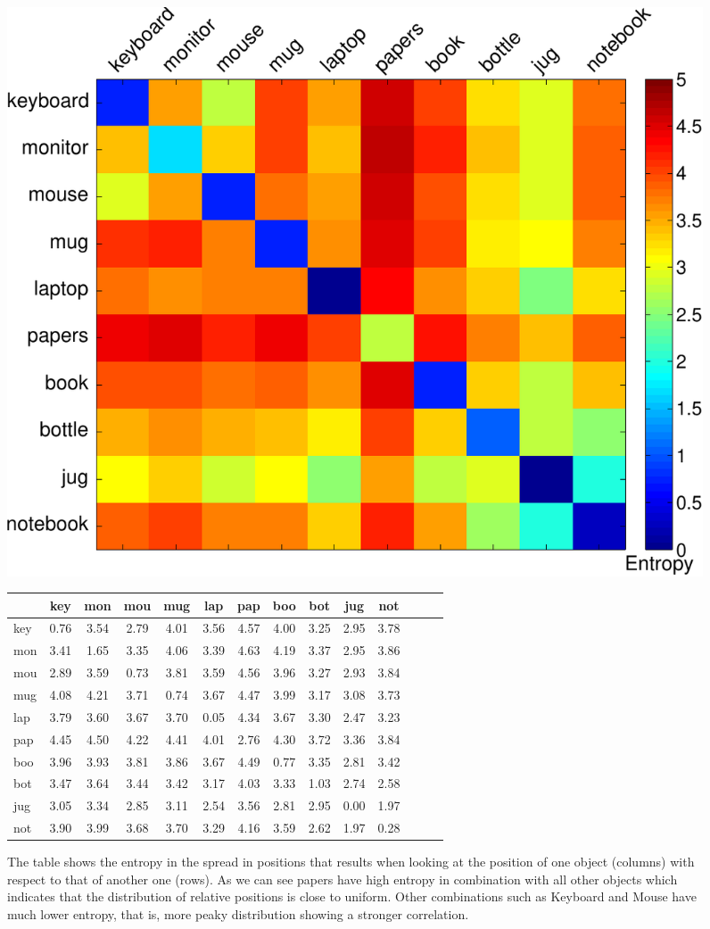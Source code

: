 \documentclass[letterpaper, 10 pt, conference]{ieeeconf}  %
\begin{document}
\begin{figure}
\begin{center}
\includegraphics[width=0.5\linewidth]{entropy_matrix-crop} \quad
\begin{tabular}{|l||c|c|c|c|c|c|c|c|c|c|c|c|c|}
\hline
& key & mon & mou & mug & lap & pap & boo & bot & jug & not \\ \hline \hline
key & 0.76 & 3.54 & 2.79 & 4.01 & 3.56 & 4.57 & 4.00 & 3.25 & 2.95 & 3.78\\ \hline
mon & 3.41 & 1.65 & 3.35 & 4.06 & 3.39 & 4.63 & 4.19 & 3.37 & 2.95 & 3.86\\ \hline
mou & 2.89 & 3.59 & 0.73 & 3.81 & 3.59 & 4.56 & 3.96 & 3.27 & 2.93 & 3.84 \\ \hline
mug & 4.08 & 4.21 & 3.71 & 0.74 & 3.67 & 4.47 & 3.99 & 3.17 & 3.08 & 3.73 \\ \hline
lap & 3.79 & 3.60 & 3.67 & 3.70 & 0.05 & 4.34 & 3.67 & 3.30 & 2.47 & 3.23 \\ \hline
pap & 4.45 & 4.50 & 4.22 & 4.41 & 4.01 & 2.76 & 4.30 & 3.72 & 3.36 & 3.84 \\ \hline
boo & 3.96 & 3.93 & 3.81 & 3.86 & 3.67 & 4.49 & 0.77 & 3.35 & 2.81 & 3.42 \\ \hline
bot & 3.47 & 3.64 & 3.44 & 3.42 & 3.17 & 4.03 & 3.33 & 1.03 & 2.74 & 2.58 \\ \hline
jug & 3.05 & 3.34 & 2.85 & 3.11 & 2.54 & 3.56 & 2.81 & 2.95 & 0.00 & 1.97 \\ \hline
not & 3.90 & 3.99 & 3.68 & 3.70 & 3.29 & 4.16 & 3.59 & 2.62 & 1.97 & 0.28 \\ \hline
\end{tabular}
\label{fig:entropy}
\caption{The table shows the entropy in the spread in positions that results when looking at the position of one object (columns) with respect to that of another one (rows). As we can see papers have high entropy in combination with all other objects which indicates that the distribution of relative positions is close to uniform. Other combinations such as Keyboard and Mouse have much lower entropy, that is, more peaky distribution showing a stronger correlation.}
\end{center}
\end{figure}
\end{document}
